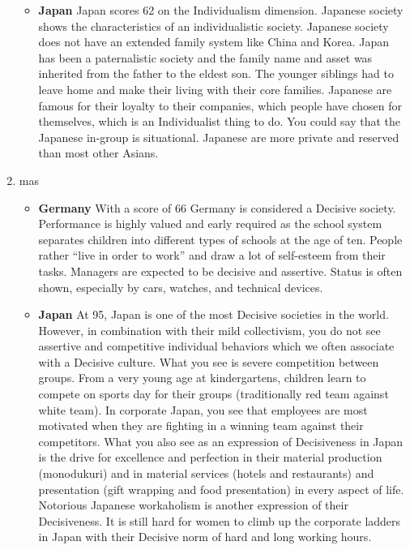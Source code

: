 \begin{enumerate}
\begin{itemize}
        \item \textbf{Japan}
        Japan scores 62 on the Individualism dimension.
        Japanese society shows the characteristics of an individualistic society.
        Japanese society does not have an extended family system like China and Korea.
        Japan has been a paternalistic society and the family name and asset was inherited from the father to the eldest son.
        The younger siblings had to leave home and make their living with their core families.
        Japanese are famous for their loyalty to their companies, which people have chosen for themselves, which is an Individualist thing to do.
        You could say that the Japanese in-group is situational.
        Japanese are more private and reserved than most other Asians.
    \end{itemize}

    \item \ac{mas}
    \begin{itemize}
        \item \textbf{Germany}
        With a score of 66 Germany is considered a Decisive society.
        Performance is highly valued and early required as the school system separates children into different types of schools at the age of ten.
        People rather “live in order to work” and draw a lot of self-esteem from their tasks.
        Managers are expected to be decisive and assertive.
        Status is often shown, especially by cars, watches, and technical devices.

        \item \textbf{Japan}
        At 95, Japan is one of the most Decisive societies in the world.
        However, in combination with their mild collectivism, you do not see assertive and competitive individual behaviors which we often associate with a Decisive culture.
        What you see is severe competition between groups.
        From a very young age at kindergartens, children learn to compete on sports day for their groups (traditionally red team against white team).
        In corporate Japan, you see that employees are most motivated when they are fighting in a winning team against their competitors.
        What you also see as an expression of Decisiveness in Japan is the drive for excellence and perfection in their material production (monodukuri) and in material services (hotels and restaurants) and presentation (gift wrapping and food presentation) in every aspect of life.
        Notorious Japanese workaholism is another expression of their Decisiveness.
        It is still hard for women to climb up the corporate ladders in Japan with their Decisive norm of hard and long working hours.
    \end{itemize}


\end{enumerate}
